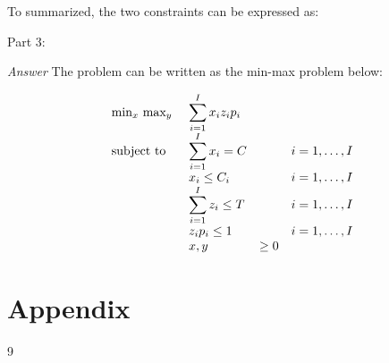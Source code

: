 \documentclass[10pt]{article}
\newenvironment{exercise}[2][Exercise]{\begin{trivlist}
  \item[\hskip \labelsep {\bfseries #1}\hskip \labelsep {\bfseries #2.}]}{\end{trivlist}}
\begin{document}
\begin{exercise}{5}
To summarized, the two constraints can be expressed as:


Part 3:

\textit{Answer}
The problem can be written as the min-max problem below:

\begin{equation}
\begin{array}{ll@{}lll}
\text{min}_x\ \text{max}_y\ && \displaystyle\sum\limits_{i=1}^{I} x_i z_i p_i\\

\text{subject to} 
&& \displaystyle\sum\limits_{i=1}^{I} x_i = C && i=1 ,\dots, I \\
&& x_i \leq C_i && i=1 ,\dots, I\\
&& \displaystyle\sum\limits_{i=1}^{I} z_i \leq T &&  i=1 ,\dots, I \\
                && z_i p_i \leq 1  &&  i=1 ,\dots, I\\
                && x,y &\geq 0\\ 



\end{array}
\end{equation}




\end{exercise}

  \section*{Appendix}
\newpage  
 \begin{thebibliography}{9}

\end{thebibliography}
 
\end{document}
